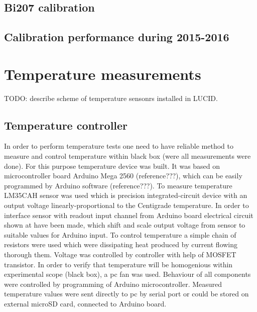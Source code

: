 \subsection{Bi207 calibration}
\label{subsec:bi207Calibration}



\subsection{Calibration performance during 2015-2016}
\label{subsec:calibPerformance}




% 
% 


\section{Temperature measurements}
\label{sec:tempMeas}

TODO: describe scheme of temperature sensonrs installed in LUCID.

\subsection{Temperature controller}
\label{subsec:tempController}

In order to perform temperature tests one need to have reliable method to measure and control temperature within black box (were all measurements were done).
For this purpose temperature device was built.
It was based on microcontroller board Arduino Mega 2560 (reference???), which can be easily programmed by Arduino software (reference???).
To measure temperature LM35CAH sensor was used which is precision integrated-circuit device with an output voltage linearly-proportional to the Centigrade temperature.
In order to interface sensor with readout input channel from Arduino board electrical circuit shown at  have been made, 
which shift and scale output voltage from sensor to suitable values for Arduino input.
To control temperature a simple chain of resistors were used which were dissipating heat produced by current flowing thorough them. 
Voltage was controlled by controller with help of MOSFET transistor. In order to verify that temperature will be homogenious within experimental scope (black box),
a pc fan was used. Behaviour of all components were controlled by programming of Arduino microcontroller.
Measured temperature values were sent directly to pc by serial port or could be stored on external microSD card, connected to Arduino board.

